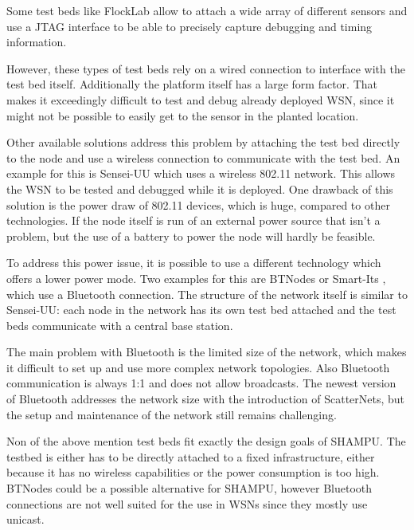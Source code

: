 Some test beds like FlockLab \cite{Lim2013} allow to attach a wide array of different sensors and use a JTAG interface to be able to precisely capture debugging and timing information.

However, these types of test beds rely on a wired connection to interface with the test bed itself. Additionally the platform itself has a large form factor. That makes it exceedingly difficult to test and debug already deployed WSN, since it might not be possible to easily get to the sensor in the planted location.

Other available solutions address this problem by attaching the test bed directly to the node and use a wireless connection to communicate with the test bed. An example for this is Sensei-UU \cite{Rensfelt2009} which uses a wireless 802.11 network. This allows the WSN to be tested and debugged while it is deployed. One drawback of this solution is the power draw of 802.11 devices, which is huge, compared to other technologies. If the node itself is run of an external power source that isn't a problem, but the use of a battery to power the node will hardly be feasible.

To address this power issue, it is possible to use a different technology which offers a lower power mode. Two examples for this are BTNodes \cite{Moser} or Smart-Its \cite{Kasten2000}, which use a Bluetooth connection. 
The structure of the network itself is similar to Sensei-UU: each node in the network has its own test bed attached and the test beds communicate with a central base station.

The main problem with Bluetooth is the limited size of the network, which makes it difficult to set up and use more complex network topologies. Also Bluetooth communication is always 1:1 and does not allow broadcasts. The newest version of Bluetooth addresses the network size with the introduction of ScatterNets, but the setup and maintenance of the network still remains challenging.

Non of the above mention test beds fit exactly the design goals of SHAMPU. The testbed is either has to be directly attached to a fixed infrastructure, either because it has no wireless capabilities or the power consumption is too high. BTNodes could be a possible alternative for SHAMPU, however Bluetooth connections are not well suited for the use in WSNs since they mostly use unicast.
